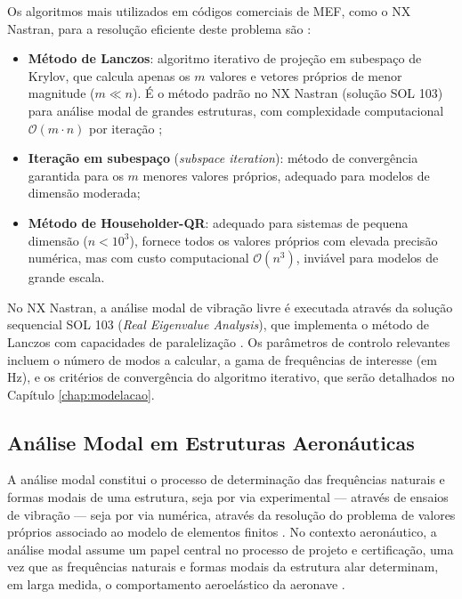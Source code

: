 \documentclass[a4paper,fleqn,noprintline]{cas-dc}
\begin{document}
Os algoritmos mais utilizados em códigos comerciais de MEF, como o NX Nastran, para a resolução eficiente deste problema são \cite{Bathe2014}:

\begin{itemize}
    \item \textbf{Método de Lanczos}: algoritmo iterativo de projeção em subespaço de Krylov, que calcula apenas os $m$ valores e vetores próprios de menor magnitude ($m \ll n$). É o método padrão no NX Nastran (solução SOL 103) para análise modal de grandes estruturas, com complexidade computacional $\mathcal{O}(m \cdot n)$ por iteração \cite{Nastran2014};

    \item \textbf{Iteração em subespaço} (\textit{subspace iteration}): método de convergência garantida para os $m$ menores valores próprios, adequado para modelos de dimensão moderada;

    \item \textbf{Método de Householder-QR}: adequado para sistemas de pequena dimensão ($n < 10^3$), fornece todos os valores próprios com elevada precisão numérica, mas com custo computacional $\mathcal{O}(n^3)$, inviável para modelos de grande escala.
\end{itemize}

No NX Nastran, a análise modal de vibração livre é executada através da solução sequencial SOL 103 (\textit{Real Eigenvalue Analysis}), que implementa o método de Lanczos com capacidades de paralelização \cite{Nastran2014}. Os parâmetros de controlo relevantes incluem o número de modos a calcular, a gama de frequências de interesse (em \si{\hertz}), e os critérios de convergência do algoritmo iterativo, que serão detalhados no Capítulo \ref{chap:modelacao}.

\subsection{Análise Modal em Estruturas Aeronáuticas}

A análise modal constitui o processo de determinação das frequências naturais e formas modais de uma estrutura, seja por via experimental --- através de ensaios de vibração --- seja por via numérica, através da resolução do problema de valores próprios associado ao modelo de elementos finitos \cite{Ewins2000, Maia1997}. No contexto aeronáutico, a análise modal assume um papel central no processo de projeto e certificação, uma vez que as frequências naturais e formas modais da estrutura alar determinam, em larga medida, o comportamento aeroelástico da aeronave \cite{Wright2015}.
\end{document}
